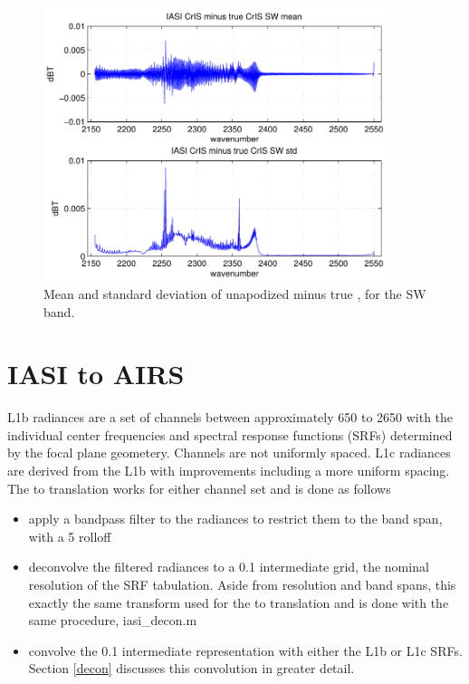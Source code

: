 \documentclass[12pt]{article}
\begin{document}
\begin{figure}
  \centering
  \includegraphics[height=8cm]{figures/iasi_cris_sw_1.pdf}
  \caption{Mean and standard deviation of unapodized {\iasi} {\cris}
    minus true {\cris}, for the {\cris} SW band.}
  \label{icsw1}
\end{figure}

\FloatBarrier


\section{IASI to AIRS}

{\airs} L1b radiances are a set of channels between approximately
650 to 2650 {\wn} with the individual center frequencies and
spectral response functions (SRFs) determined by the focal plane
geometery.  Channels are not uniformly spaced.  {\airs} L1c
radiances are derived from the L1b with improvements including a
more uniform spacing.  The {\iasi} to {\airs} translation works for
either channel set and is done as follows


\begin{itemize}

  \item apply a bandpass filter to the {\iasi} radiances to restrict
    them to the {\airs} band span, with a 5 {\wn} rolloff

  \item deconvolve the filtered {\iasi} radiances to a 0.1 {\wn}
    intermediate grid, the nominal resolution of the {\airs} SRF
    tabulation.  Aside from resolution and band spans, this exactly
    the same transform used for the {\iasi} to {\cris} translation
    and is done with the same procedure, iasi\_decon.m

  \item convolve the 0.1 {\wn} intermediate representation with either
    the {\airs} L1b or L1c SRFs.  Section \ref{decon} discusses this
    convolution in greater detail.
    
\end{itemize}
\end{document}
